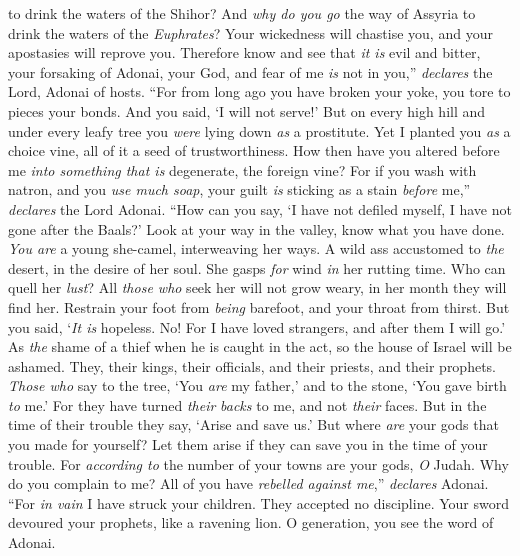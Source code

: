 \begin{biblechapter}
to drink the waters of the Shihor? 
And \textit{why do you go} the way of Assyria 
to drink the waters of the \textit{Euphrates}?
\verse Your wickedness will chastise you, 
and your apostasies will reprove you. 
Therefore know and see that \textit{it is} evil and bitter, 
your forsaking of Adonai, your God, 
and fear of me \textit{is} not in you,” 
\textit{declares} the Lord, Adonai of hosts.
\verse “For from long ago you have broken your yoke, 
you tore to pieces your bonds. 
And you said, ‘I will not serve!’ 
But on every high hill and under every leafy tree 
you \textit{were} lying down \textit{as} a prostitute.
\verse Yet I planted you \textit{as} a choice vine, 
all of it a seed of trustworthiness. 
How then have you altered before me 
\textit{into something that is} degenerate, the foreign vine?
\verse For if you wash with natron, 
and you \textit{use much soap}, 
your guilt \textit{is} sticking as a stain \textit{before} me,” 
\textit{declares} the Lord Adonai.
\verse “How can you say, ‘I have not defiled myself, 
I have not gone after the Baals?’ 
Look at your way in the valley, 
know what you have done. 
\textit{You are} a young she-camel, 
interweaving her ways.
\verse A wild ass accustomed to \textit{the} desert, 
in the desire of her soul. 
She gasps \textit{for} wind \textit{in} her rutting time. 
Who can quell her \textit{lust}? 
All \textit{those who} seek her will not grow weary, 
in her month they will find her.
\verse Restrain your foot from \textit{being} barefoot, 
and your throat from thirst. 
But you said, ‘\textit{It is} hopeless. 
No! For I have loved strangers, 
and after them I will go.’
\verse As \textit{the} shame of a thief when he is caught in the act, 
so the house of Israel will be ashamed. 
They, their kings, their officials, 
and their priests, and their prophets.
\verse \textit{Those who} say to the tree, ‘You \textit{are} my father,’ 
and to the stone, ‘You gave birth \textit{to} me.’ 
For they have turned \textit{their} \textit{backs} to me, and not \textit{their} faces. 
But in the time of their trouble they say, ‘Arise and save us.’
\verse But where \textit{are} your gods that you made for yourself? 
Let them arise if they can save you in the time of your trouble. 
For \textit{according to} the number of your towns 
are your gods, \textit{O} Judah.
\verse Why do you complain to me? 
All of you have \textit{rebelled against me},” \textit{declares} Adonai.
\verse “For \textit{in vain} I have struck your children. 
They accepted no discipline. 
Your sword devoured your prophets, 
like a ravening lion.
\verse O generation, you see the word of Adonai. 

\end{biblechapter}
